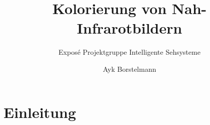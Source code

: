 \documentclass[runningheads]{llncs}
\begin{document}
\title{Kolorierung von Nah-Infrarotbildern}
\subtitle{Exposé Projektgruppe Intelligente Sehsysteme}
\author{Ayk Borstelmann}
\maketitle
%
%
%
\section{Einleitung}
\cite{limmer2016infrared}
\cite{dong2018infrared}
\cite{mehri2019colorizing}
\printbibliography
\end{document}
